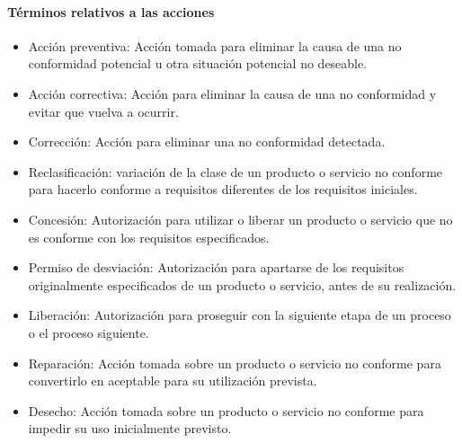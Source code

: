 		\paragraph{Términos relativos a las acciones}
			\begin{itemize}
				\item Acción preventiva: Acción tomada para eliminar la causa de una no conformidad potencial u otra situación potencial
				no deseable.
				
				\item Acción correctiva: Acción para eliminar la causa de una no conformidad y evitar que vuelva a ocurrir.
				
				\item Corrección: Acción para eliminar una no conformidad detectada.
				
				\item Reclasificación: variación de la clase de un producto o servicio no conforme para hacerlo
				conforme a requisitos diferentes de los requisitos iniciales.
				
				\item  Concesión: Autorización para utilizar o liberar un producto o servicio que no es conforme con los requisitos especificados.
				
				\item Permiso de desviación: Autorización para apartarse de los requisitos originalmente especificados de un producto 
				o servicio, antes de su realización.
				
				\item Liberación: Autorización para proseguir con la siguiente etapa de un proceso o el proceso siguiente.
				
				\item Reparación: Acción tomada sobre un producto o servicio no conforme para convertirlo en aceptable para su utilización prevista.
				
				\item Desecho: Acción tomada sobre un producto o servicio no conforme para impedir su uso
				inicialmente previsto.
				
			\end{itemize}
		
\newpage
\thispagestyle{plain}